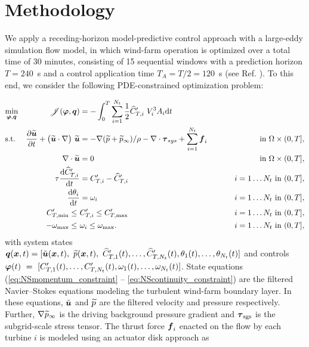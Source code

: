 \documentclass[a4paper]{jpconf}
\begin{document}
 \section{Methodology}

We apply a receding-horizon model-predictive control approach with a  large-eddy simulation flow model, in which wind-farm operation is optimized over a total time of 30 minutes, consisting of 15 sequential windows with a prediction horizon $T = 240$~s and a control application time $T_A = T/2 = 120$~s (see Ref. \cite{munters}). To this end, we consider the following PDE-constrained optimization problem:

\begin{alignat}{4}
& \underset{\boldsymbol{\varphi}, \boldsymbol{q}}{\text{min}}  & \hspace*{25pt}  \mathscr{J}(\boldsymbol{\varphi}, \boldsymbol{q}) &= - \int_{0}^{T} \sum_{i=1}^{N_t} \frac{1}{2} \widehat{C}_{T,i}'~V_i^3 A_i \text{d}t  & \label{eq:costfunction}\\
& \text{s.t.}                      			&         \frac{\partial \widetilde{\boldsymbol{u}}}{\partial t} + \big(\widetilde{\boldsymbol{u}} \cdot \nabla \big)~ \widetilde{\boldsymbol{u}} &= - \nabla (\widetilde{p} + \widetilde{p}_\infty) / \rho - \nabla \cdot \boldsymbol{\tau}_{sgs} + \sum_{i=1}^{N_t} \boldsymbol{f}_i \hspace*{25pt}  & \text{in } \Omega \times (0,T], \label{eq:NSmomentum_constraint} \\
&                                                   &        \nabla \cdot \widetilde{\boldsymbol{u}}&=0 									        & \text{in } \Omega \times (0,T], \label{eq:NScontinuity_constraint}\\
&                                                   &        \tau \frac{\text{d} \widehat{C}_{T,i}'}{\text{d} t}&=C_{T,i}' - \widehat{C}_{T,i}' 								& i=1\dots N_t~\text{in } (0,T],  \label{eq:ctihat_constraint}\\
&                                                   &        \frac{\text{d} \theta_i}{\text{d} t}&=\omega_i											& i=1\dots N_t~\text{in } (0,T],  \label{eq:omega_constraint}\\
&                                                   &        C_{T,\text{min}}' \leq~ &C_{T,i}' \leq C_{T,\text{max}}'				& i=1\dots N_t~\text{in } (0,T],  \label{eq:boxct_constraint}\\
&                                                   &        -\omega_{\text{max}} \leq~ &\omega_i \leq \omega_{\text{max}}.   	& i=1\dots N_t~\text{in } (0,T],  \label{eq:boxomega_constraint}
\end{alignat}
with system states $\bolds{q}(\bolds{x},t) = [\ufilt(\bolds{x},t),\ \ptilde(\bolds{x},t),\ \ctnhat{1}(t), \dots, \ctnhat{N_t}(t), \theta_1(t), \dots, \theta_{N_t}(t)]$ and controls $\boldsymbol{\varphi}(t)~=~[C_{T,1}'(t), \dots, C_{T,N_t}'(t), \omega_1(t), \dots, \omega_{N_t}(t)]$. State equations (\ref{eq:NSmomentum_constraint} -- \ref{eq:NScontinuity_constraint}) are the filtered Navier--Stokes equations modeling the turbulent wind-farm boundary layer. In these equations, $\tilde{\boldsymbol{u}}$ and $\widetilde{p}$ are the filtered velocity and pressure respectively. Further, $\nabla \widetilde{p}_\infty$ is the driving background pressure gradient and $\boldsymbol{\tau}_{\rm sgs}$ is the subgrid-scale stress tensor. The thrust force $\boldsymbol{f}_i$ enacted on the flow by each turbine $i$ is modeled using an actuator disk approach as 
\end{document}
